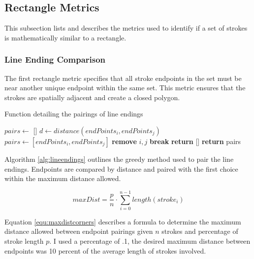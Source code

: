 \subsection{Rectangle Metrics}

This subsection lists and describes the metrics used to identify if a set of strokes is mathematically similar to a rectangle.

\subsubsection{Line Ending Comparison}

The first rectangle metric specifies that all stroke endpoints in the set must be near another unique endpoint within the same set. This metric ensures that the strokes are spatially adjacent and create a closed polygon.

\begin{algorithm}
\caption[Function for Line Ending Pairings]{Function detailing the pairings of line endings}
\label{alg:lineendings}
\begin{algorithmic}[1]
\State $pairs \gets $ []
        \State $d \gets distance(endPoints_i, endPoints_j)$
            \State $pairs \gets [endPoints_i, endPoints_j]$
            \State \textbf{remove} $i, j$
            \State \textbf{break}
        \EndIf
    \EndFor
        \State \textbf{return} []
    \Else
        \State \textbf{return} pairs
    \EndIf
\EndFor
\EndFunction
\end{algorithmic}
\end{algorithm}

Algorithm \ref{alg:lineendings} outlines the greedy method used to pair the line endings. Endpoints are compared by distance and paired with the first choice within the maximum distance allowed.

\begin{equation}
\label{equ:maxdistcorners}
maxDist = \dfrac{p}{n} \cdot \sum_{i=0}^{n-1} length(stroke_i)
\end{equation}

Equation \ref{equ:maxdistcorners} describes a formula to determine the maximum distance allowed between endpoint pairings given $n$ strokes and percentage of stroke length $p$. I used a percentage of .1, the desired maximum distance between endpoints was 10 percent of the average length of strokes involved. 

